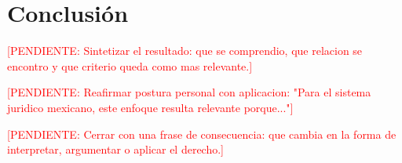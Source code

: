 \documentclass[
	spanish,
	letterpaper, oneside
]{article}
\newcommand{\pendiente}[1]{\textcolor{red}{[PENDIENTE: #1]}}
\begin{document}
\section{Conclusión}

\pendiente{Sintetizar el resultado: que se comprendio, que relacion se encontro y que criterio queda como mas relevante.}

\pendiente{Reafirmar postura personal con aplicacion: "Para el sistema juridico mexicano, este enfoque resulta relevante porque..."}

\pendiente{Cerrar con una frase de consecuencia: que cambia en la forma de interpretar, argumentar o aplicar el derecho.}

%
%
%
\end{document}
